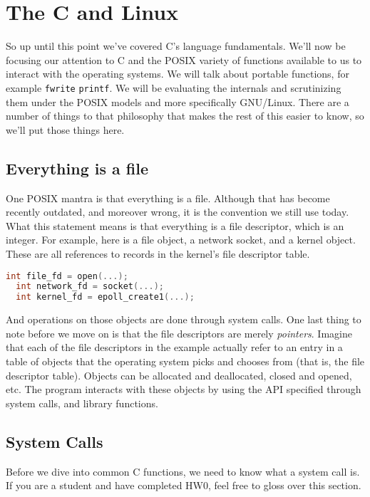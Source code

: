 \section{The C and Linux}

So up until this point we've covered C's language fundamentals.
We'll now be focusing our attention to C and the POSIX variety of functions available to us to interact with the operating systems.
We will talk about portable functions, for example \texttt{fwrite} \texttt{printf}.
We will be evaluating the internals and scrutinizing them under the POSIX models and more specifically GNU/Linux.
There are a number of things to that philosophy that makes the rest of this easier to know, so we'll put those things here.

\subsection{Everything is a file}

One POSIX mantra is that everything is a file.
Although that has become recently outdated, and moreover wrong, it is the convention we still use today.
What this statement means is that everything is a file descriptor, which is an integer.
For example, here is a file object, a network socket, and a kernel object.
These are all references to records in the kernel's file descriptor table.

\begin{lstlisting}[language=C]
  int file_fd = open(...);
  int network_fd = socket(...);
  int kernel_fd = epoll_create1(...);
\end{lstlisting}

And operations on those objects are done through system calls.
One last thing to note before we move on is that the file descriptors are merely \textit{pointers}.
Imagine that each of the file descriptors in the example actually refer to an entry in a table of objects that the operating system picks and chooses from (that is, the file descriptor table).
Objects can be allocated and deallocated, closed and opened, etc.
The program interacts with these objects by using the API specified through system calls, and library functions.

\subsection{System Calls}

Before we dive into common C functions, we need to know what a system call is.
If you are a student and have completed HW0, feel free to gloss over this section.

